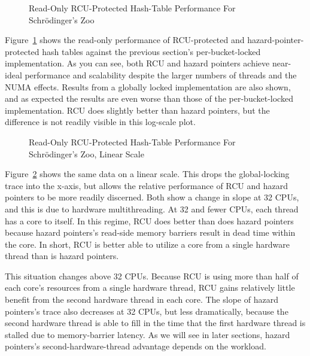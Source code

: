 \begin{figure}[tb]
\centering
{}
\caption{Read-Only RCU-Protected Hash-Table Performance For Schr\"odinger's Zoo}
\label{fig:datastruct:Read-Only RCU-Protected Hash-Table Performance For Schroedinger's Zoo}
\end{figure}

Figure~\ref{fig:datastruct:Read-Only RCU-Protected Hash-Table Performance For Schroedinger's Zoo}
shows the read-only performance of RCU-protected and hazard-pointer-protected
hash tables against the previous section's per-bucket-locked implementation.
As you can see, both RCU and hazard pointers achieve near-ideal performance
and scalability despite the larger numbers of threads and the NUMA effects.
Results from a globally locked implementation are also shown, and as expected
the results are even worse than those of the per-bucket-locked implementation.
RCU does slightly better than hazard pointers, but the difference is not
readily visible in this log-scale plot.

\begin{figure}[tb]
\centering
{}
\caption{Read-Only RCU-Protected Hash-Table Performance For Schr\"odinger's Zoo, Linear Scale}
\label{fig:datastruct:Read-Only RCU-Protected Hash-Table Performance For Schroedinger's Zoo, Linear Scale}
\end{figure}

Figure~\ref{fig:datastruct:Read-Only RCU-Protected Hash-Table Performance For Schroedinger's Zoo, Linear Scale}
shows the same data on a linear scale.
This drops the global-locking trace into the x-axis, but allows the
relative performance of RCU and hazard pointers to be more readily
discerned.
Both show a change in slope at 32 CPUs, and this is due to hardware
multithreading.
At 32 and fewer CPUs, each thread has a core to itself.
In this regime, RCU does better than does hazard pointers because
hazard pointers's read-side memory barriers result in dead time within
the core.
In short, RCU is better able to utilize a core from a single hardware
thread than is hazard pointers.

This situation changes above 32 CPUs.
Because RCU is using more than half of each core's resources from a
single hardware thread, RCU gains relatively little benefit from the
second hardware thread in each core.
The slope of hazard pointers's trace also decreases at 32 CPUs, but
less dramatically,
because the second hardware thread is able to fill in the time
that the first hardware thread is stalled due to memory-barrier latency.
As we will see in later sections, hazard pointers's second-hardware-thread
advantage depends on the workload.


